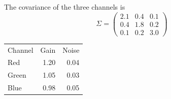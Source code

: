 \documentclass[twocolumn]{article}
\begin{document}
\lipsum[1][1-6]
The covariance of the three channels is
\[ \Sigma = \begin{pmatrix} 2.1 & 0.4 & 0.1 \\ 0.4 & 1.8 & 0.2 \\ 0.1 & 0.2 & 3.0 \end{pmatrix} \]
\lipsum[2][1-12]
\lipsum[3][1-8]

\begin{tabular}{lrr}
Channel & Gain & Noise \\
Red & 1.20 & 0.04 \\
Green & 1.05 & 0.03 \\
Blue & 0.98 & 0.05 \\
\end{tabular}

\lipsum[4][1-8]
\end{document}
